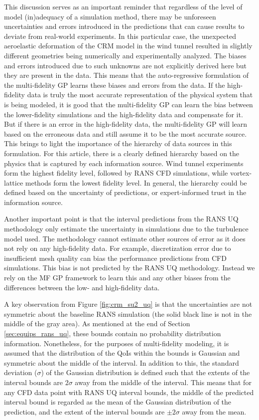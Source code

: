 This discussion serves as an important reminder that regardless of the level of model (in)adequacy of a simulation method, there may be unforeseen uncertainties and errors introduced in the predictions that can cause results to deviate from real-world experiments. In this particular case, the unexpected aeroelastic deformation of the CRM model in the wind tunnel resulted in slightly different geometries being numerically and experimentally analyzed. The biases and errors introduced due to such unknowns are not explicitly derived here but they are present in the data. This means that the auto-regressive formulation of the multi-fidelity GP learns these biases and errors from the data. If the high-fidelity data is truly the most accurate representation of the physical system that is being modeled, it is good that the multi-fidelity GP can learn the bias between the lower-fidelity simulations and the high-fidelity data and compensate for it. But if there is an error in the high-fidelity data, the multi-fidelity GP will learn based on the erroneous data and still assume it to be the most accurate source. This brings to light the importance of the hierarchy of data sources in this formulation. For this article, there is a clearly defined hierarchy based on the physics that is captured by each information source. Wind tunnel experiments form the highest fidelity level, followed by RANS CFD simulations, while vortex-lattice methods form the lowest fidelity level. In general, the hierarchy could be defined based on the uncertainty of predictions, or expert-informed trust in the information source.

Another important point is that the interval predictions from the RANS UQ methodology only estimate the uncertainty in simulations due to the turbulence model used. The methodology cannot estimate other sources of error as it does not rely on any high-fidelity data. For example, discretization error due to insufficient mesh quality can bias the performance predictions from CFD simulations. This bias is not predicted by the RANS UQ methodology. Instead we rely on the MF GP framework to learn this and any other biases from the differences between the low- and high-fidelity data. 

A key observation from Figure \ref{fig:crm_su2_uq} is that the uncertainties are not symmetric about the baseline RANS simulation (the solid black line is not in the middle of the gray area). As mentioned at the end of Section \ref{sec:equips_rans_uq}, these bounds contain no probability distribution information. Nonetheless, for the purposes of multi-fidelity modeling, it is assumed that the distribution of the QoIs within the bounds is Gaussian and symmetric about the middle of the interval. In addition to this, the standard deviation ($\sigma$) of the Gaussian distribution is defined such that the extents of the interval bounds are $2\sigma$ away from the middle of the interval. This means that for any CFD data point with RANS UQ interval bounds, the middle of the predicted interval bound is regarded as the mean of the Gaussian distribution of the prediction, and the extent of the interval bounds are $\pm 2\sigma$ away from the mean.

